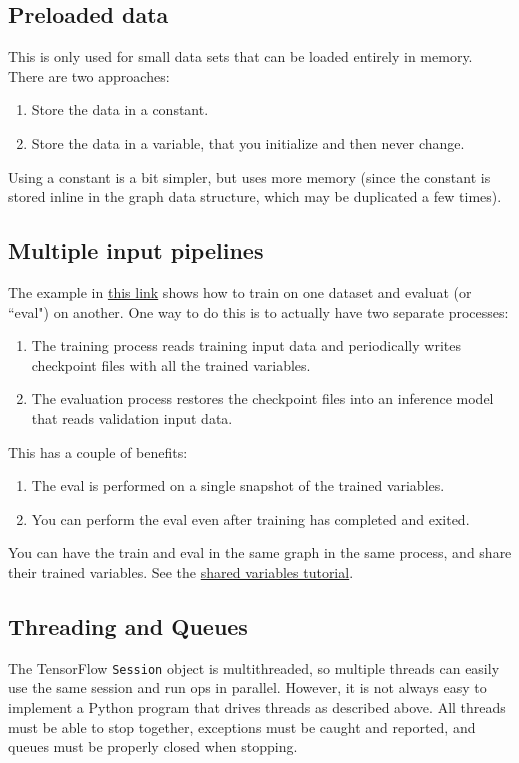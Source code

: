 \documentclass[11pt,a4paper]{article}
\begin{document}
\subsection{Preloaded data}
This is only used for small data sets that can be loaded entirely in memory. There are two approaches: 
\begin{enumerate}
	\item Store the data in a constant. 
	\item Store the data in a variable, that you initialize and then never change. 
\end{enumerate}
Using a constant is a bit simpler, but uses more memory (since the constant is stored inline in the graph data structure, which may be duplicated a few times).
\subsection{Multiple input pipelines}
The example in \href{https://www.tensorflow.org/versions/r0.11/tutorials/deep_cnn/index.html#save-and-restore-checkpoints}{this link} shows how to train on one dataset and evaluat (or ``eval") on another. One way to do this is to actually have two separate processes:
\begin{enumerate}
	\item The training process reads training input data and periodically writes checkpoint files with all the trained variables.
	\item The evaluation process restores the checkpoint files into an inference model that reads validation input data.
\end{enumerate}
This has a couple of benefits: 
\begin{enumerate}
	\item The eval is performed on a single snapshot of the trained variables.
	\item You can perform the eval even after training has completed and exited.
\end{enumerate}
You can have the train and eval in the same graph in the same process, and share their trained variables. See the \href{https://www.tensorflow.org/versions/r0.11/how_tos/variable_scope/index.html}{shared variables tutorial}.

\subsection{Threading and Queues}
The TensorFlow \texttt{Session} object is multithreaded, so multiple threads can easily use the same session and run ops in parallel. However, it is not always easy to implement a Python program that drives threads as described above. All threads must be able to stop together, exceptions must be caught and reported, and queues must be properly closed when stopping.
\end{document}
